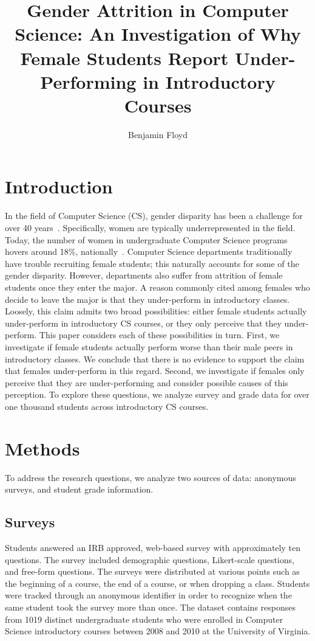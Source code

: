 \documentclass[a4paper,man,natbib]{apa6}
\title{Gender Attrition in Computer Science: An Investigation of Why Female Students Report Under-Performing in Introductory Courses}
\author{Benjamin Floyd}
\affiliation{University of Virginia}
\begin{document}
\maketitle

\section{Introduction}
\label{sec:intro}
In the field of Computer Science (CS), gender disparity has been a challenge
for over 40 years~\citep{Dale-studentprofile, Camp, Cohoon-retention,
Frenkel-women, Klawe-increasingpaarticipation, Montanelli-women,
Spertus-whysofew}. Specifically, women are typically underrepresented in the
field. Today, the number of women in undergraduate Computer Science programs
hovers around 18\%, nationally~\citep{womenincs-DOE}. Computer Science departments
traditionally have trouble recruiting female students; this naturally accounts
for some of the gender disparity. However, departments also suffer from
attrition of female students once they enter the major. A reason commonly cited
among females who decide to leave the major is that they under-perform in
introductory classes. Loosely, this claim admits two broad possibilities:
either female students actually under-perform in introductory CS courses, or they
only perceive that they under-perform. This paper considers each of these
possibilities in turn. First, we investigate if female students actually
perform worse than their male peers in introductory classes. We conclude that
there is no evidence to support the claim that females under-perform in this
regard. Second, we investigate if females only perceive that they are
under-performing and consider possible causes of this perception. To explore
these questions, we analyze survey and grade data for over one thousand
students across introductory CS courses.

\section{Methods}
\label{sec:methods}
To address the research questions, we analyze two sources of data: anonymous
surveys, and student grade information. 

\subsection{Surveys}
\label{sec:survey}
Students answered an IRB approved, web-based survey with approximately ten
questions. The survey included demographic questions, Likert-scale questions,
and free-form questions. The surveys were distributed at various points such as the
beginning of a course, the end of a course, or when dropping a class. Students
were tracked through an anonymous identifier in order to recognize when the
same student took the survey more than once. The dataset contains responses
from 1019 distinct undergraduate students who were enrolled in Computer Science
introductory courses between 2008 and 2010 at the University of Virginia.
\end{document}
